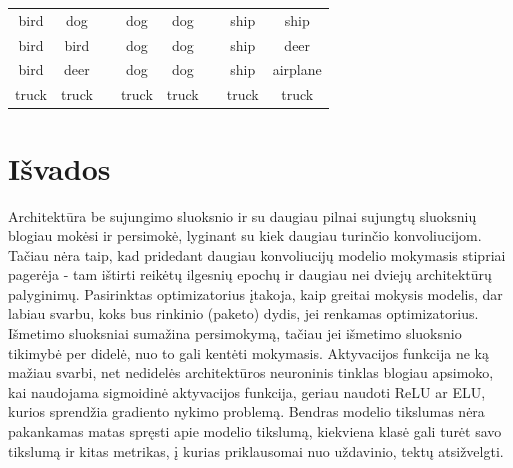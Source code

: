 \documentclass{VUMIFPSbakalaurinis}
\begin{document}
\begin{table}[]
{{\begin{tabular}{|c|c|c|c|c|c|c|c|}
      bird               & dog                  &           & dog                & dog                  &           & ship               & ship                 \\ \cline{1-2} \cline{4-5} \cline{7-8} 
      bird               & bird                 &           & dog                & dog                  &           & ship               & deer                 \\ \cline{1-2} \cline{4-5} \cline{7-8} 
      bird               & deer                 &           & dog                & dog                  &           & ship               & airplane             \\ \cline{1-2} \cline{4-5} \cline{7-8} 
      truck              & truck                &           & truck              & truck                &           & truck              & truck                \\ \cline{1-2} \cline{4-5} \cline{7-8} 
      \end{tabular}}%
  }
  \label{tab:30-rez}
\end{table}

\section{Išvados}
Architektūra be sujungimo sluoksnio ir su daugiau pilnai sujungtų sluoksnių
blogiau mokėsi ir persimokė, lyginant su kiek daugiau turinčio konvoliucijom.
Tačiau nėra taip, kad pridedant daugiau konvoliucijų modelio mokymasis
stipriai pagerėja - tam ištirti reikėtų ilgesnių epochų ir daugiau nei
dviejų architektūrų palyginimų. Pasirinktas optimizatorius įtakoja,
kaip greitai mokysis modelis, dar labiau svarbu, koks bus
rinkinio (paketo) dydis, jei renkamas optimizatorius. Išmetimo sluoksniai
sumažina persimokymą, tačiau jei išmetimo sluoksnio tikimybė per didelė,
nuo to gali kentėti mokymasis. Aktyvacijos funkcija ne ką mažiau svarbi,
net nedidelės architektūros neuroninis tinklas blogiau apsimoko, kai
naudojama sigmoidinė aktyvacijos funkcija, geriau naudoti ReLU ar ELU, kurios
sprendžia gradiento nykimo problemą. Bendras modelio tikslumas nėra pakankamas
matas spręsti apie modelio tikslumą, kiekviena klasė gali turėt savo tikslumą
ir kitas metrikas, į kurias priklausomai nuo uždavinio, tektų atsižvelgti.
\end{document}
